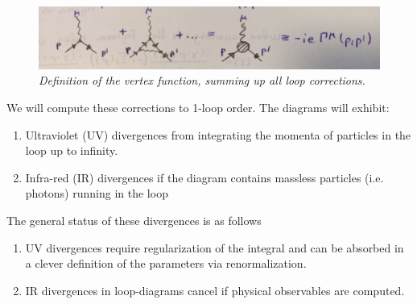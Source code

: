 \begin{figure}
	\centering
	\includegraphics[width=0.7\linewidth]{gfx/VertexFunctionQED}
	\caption{\itshape Definition of the vertex function, summing up all loop corrections.}
	\label{fig:vertexfunctionqed}
\end{figure}
We will compute these corrections to 1-loop order. The diagrams will exhibit:
\begin{enumerate}
	\item Ultraviolet (UV) divergences from integrating the momenta of particles in the loop up to infinity.
	\item Infra-red (IR) divergences if the diagram contains massless particles (i.e. photons) running in the loop
\end{enumerate}
The general status of these divergences is as follows
\begin{enumerate}
	\item UV divergences require regularization of the integral and can be absorbed in a clever definition of the parameters via renormalization.
	\item IR divergences in loop-diagrams cancel if physical observables are computed.
\end{enumerate}



